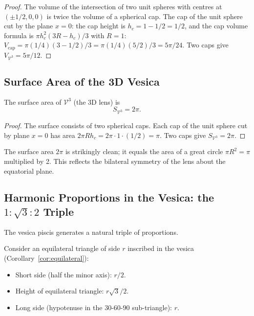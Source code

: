 \begin{proof}
The volume of the intersection of two unit spheres with centres at
\((\pm 1/2, 0, 0)\) is twice the volume of a spherical cap.
The cap of the unit sphere cut by the plane \(x=0\):
the cap height is \(h_c = 1 - 1/2 = 1/2\), and
the cap volume formula is \(\pi h_c^2 (3R - h_c)/3\) with \(R=1\):
\(V_{\text{cap}} = \pi (1/4)(3 - 1/2)/3 = \pi (1/4)(5/2)/3 = 5\pi/24\).
Two caps give \(V_{\mathcal{V}^3} = 5\pi/12\).
\end{proof}

\subsection{Surface Area of the 3D Vesica}
\label{subsec:ch11-surface}

\begin{proposition}\label{prop:surface-area}
The surface area of \(\mathcal{V}^3\) (the 3D lens) is
\[
  S_{\mathcal{V}^3} = 2\pi.
\]
\end{proposition}

\begin{proof}
The surface consists of two spherical caps.
Each cap of the unit sphere cut by plane \(x=0\) has area
\(2\pi R h_c = 2\pi \cdot 1 \cdot (1/2) = \pi\).
Two caps give \(S_{\mathcal{V}^3} = 2\pi\).
\end{proof}

\begin{remark}
The surface area \(2\pi\) is strikingly clean; it equals the area of a
great circle \(\pi R^2 = \pi\) multiplied by 2.
This reflects the bilateral symmetry of the lens about the
equatorial plane.
\end{remark}

\subsection{Harmonic Proportions in the Vesica: the \(1:\sqrt{3}:2\) Triple}
\label{subsec:ch11-harmonic}

The vesica piscis generates a natural triple of proportions.

Consider an equilateral triangle of side \(r\) inscribed in the vesica
(Corollary~\ref{cor:equilateral}):
\begin{itemize}
\item Short side (half the minor axis): \(r/2\).
\item Height of equilateral triangle: \(r\sqrt{3}/2\).
\item Long side (hypotenuse in the \(30\)-\(60\)-\(90\) sub-triangle): \(r\).
\end{itemize}

